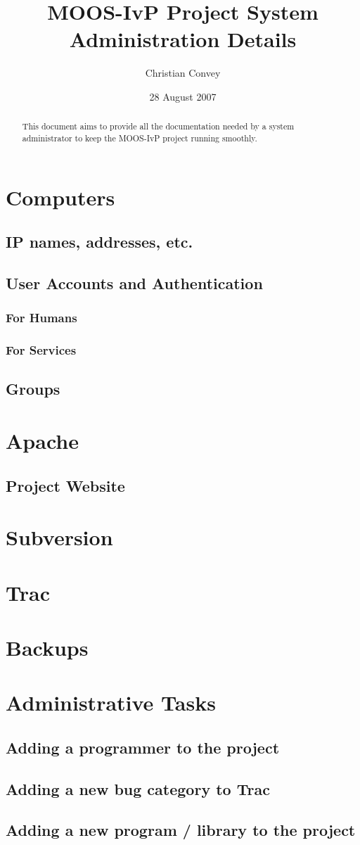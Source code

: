 \documentclass[letterpaper,10pt]{article}
\title{MOOS-IvP Project System Administration Details}
\author{Christian Convey}
\date{28 August 2007}
\begin{document}
\maketitle

\begin{abstract}
This document aims to provide all the documentation needed by a system administrator to keep
the MOOS-IvP project running smoothly.
\end{abstract}


\tableofcontents

\section{Computers}
\subsection{IP names, addresses, etc.}
\subsection{User Accounts and Authentication}
\subsubsection{For Humans}
\subsubsection{For Services}
\subsection{Groups}

\section{Apache}
\subsection{Project Website}

\section{Subversion}

\section{Trac}

\section{Backups}

\section{Administrative Tasks}
\subsection{Adding a programmer to the project}
\subsection{Adding a new bug category to Trac}
\subsection{Adding a new program / library to the project}
\end{document}
